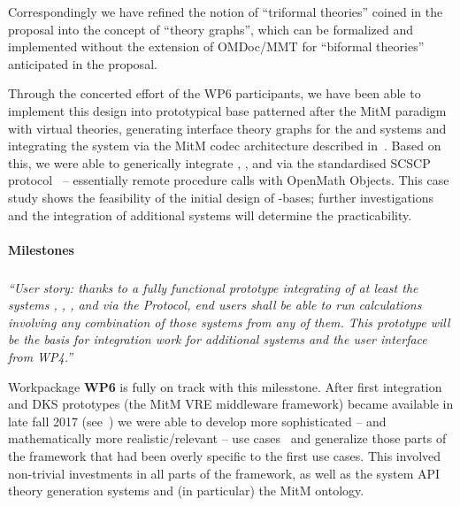Correspondingly we have refined the notion of ``triformal theories'' coined in the proposal into the concept of ``\DKS theory graphs'', which can be formalized and implemented without the extension of OMDoc/MMT for ``biformal theories'' anticipated in the proposal.

Through the concerted effort of the WP6 participants, we have been able to implement this design into prototypical \DKS base patterned after the MitM paradigm with virtual theories, generating interface theory graphs for the \GAP and \Sage systems and integrating the \LMFDB system via the MitM codec architecture described in~\cite{ODK-D6.2}.
Based on this, we were able to generically integrate \GAP, \Sage, and \LMFDB via the standardised SCSCP protocol~\cite{HorRoz:ossp09} -- essentially remote procedure calls with OpenMath Objects.
This case study shows the feasibility of the initial design of \DKS-bases; further investigations and the integration of additional systems will determine the practicability.

\paragraph{Milestones}

\subparagraph{}
\emph{“User story: thanks to a fully functional prototype integrating of at least the systems \GAP, \Sage, \Singular, and \LMFDB via the \SCSCP Protocol, end users shall be able to run calculations involving any combination of those systems from any of them.
  This prototype will be the basis for integration work for additional systems and the user interface from WP4.”}
\medskip

Workpackage \textbf{WP6} is fully on track with this milesstone.
After first integration and DKS prototypes (the MitM VRE middleware  framework) became available in late fall 2017 (see~\cite{KohMuePfe:kbimss17,WieKohRab:vtuimkb17}) we were able to develop more sophisticated -- and mathematically more realistic/relevant -- use cases~\cite{CreLow:mdcmds18} and generalize those parts of the framework that had been overly specific to the first use cases.
This involved non-trivial investments in all parts of the framework, as well as the system API theory generation systems and (in particular) the MitM ontology. 

